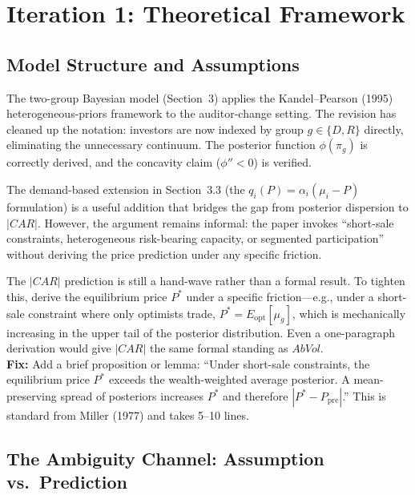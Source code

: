 \documentclass[11pt]{article}
\begin{document}
\newpage

\section{Iteration 1: Theoretical Framework}
\label{sec:theory}

\subsection{Model Structure and Assumptions}

The two-group Bayesian model (Section~3) applies the Kandel--Pearson (1995) heterogeneous-priors framework to the auditor-change setting. The revision has cleaned up the notation: investors are now indexed by group $g \in \{D, R\}$ directly, eliminating the unnecessary continuum. The posterior function $\phi(\pi_g)$ is correctly derived, and the concavity claim ($\phi'' < 0$) is verified.

The demand-based extension in Section~3.3 (the $q_i(P) = \alpha_i(\mu_i - P)$ formulation) is a useful addition that bridges the gap from posterior dispersion to $|CAR|$. However, the argument remains informal: the paper invokes ``short-sale constraints, heterogeneous risk-bearing capacity, or segmented participation'' without deriving the price prediction under any specific friction.

\begin{majorbox}
The $|CAR|$ prediction is still a hand-wave rather than a formal result. To tighten this, derive the equilibrium price $P^*$ under a specific friction---e.g., under a short-sale constraint where only optimists trade, $P^* = E_{\text{opt}}[\mu_g]$, which is mechanically increasing in the upper tail of the posterior distribution. Even a one-paragraph derivation would give $|CAR|$ the same formal standing as $AbVol$.\\[4pt]
\textbf{Fix:} Add a brief proposition or lemma: ``Under short-sale constraints, the equilibrium price $P^*$ exceeds the wealth-weighted average posterior. A mean-preserving spread of posteriors increases $P^*$ and therefore $|P^* - P_{\text{pre}}|$.'' This is standard from Miller (1977) and takes 5--10 lines.
\end{majorbox}

\subsection{The Ambiguity Channel: Assumption vs.\ Prediction}
\end{document}
